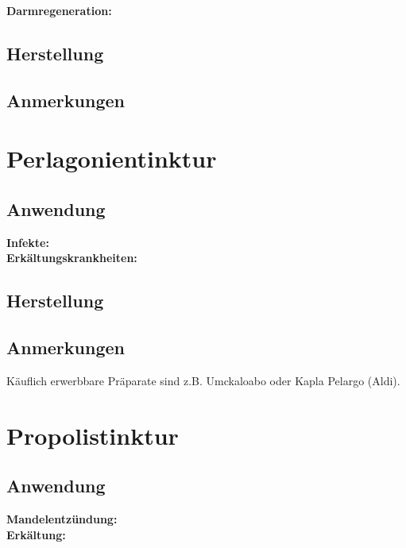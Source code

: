 \textbf{Darmregeneration:} \\ 

\subsection{Herstellung}

\subsection{Anmerkungen}





\section{Perlagonientinktur}

\subsection{Anwendung}

\textbf{Infekte:} \\ 

\textbf{Erkältungskrankheiten:} \\ 


\subsection{Herstellung}

\subsection{Anmerkungen}

Käuflich erwerbbare Präparate sind z.B. Umckaloabo oder Kapla Pelargo (Aldi).



\section{Propolistinktur}

\subsection{Anwendung}

\textbf{Mandelentzündung:} \\

\textbf{Erkältung:} \\ 

